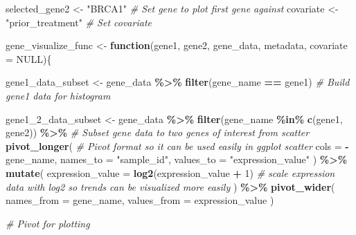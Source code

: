 \documentclass[
]{article}
\newenvironment{Shaded}{\begin{snugshade}}{\end{snugshade}}
\newcommand{\AttributeTok}[1]{\textcolor[rgb]{0.13,0.29,0.53}{#1}}
\newcommand{\CommentTok}[1]{\textcolor[rgb]{0.56,0.35,0.01}{\textit{#1}}}
\newcommand{\ConstantTok}[1]{\textcolor[rgb]{0.56,0.35,0.01}{#1}}
\newcommand{\ControlFlowTok}[1]{\textcolor[rgb]{0.13,0.29,0.53}{\textbf{#1}}}
\newcommand{\DecValTok}[1]{\textcolor[rgb]{0.00,0.00,0.81}{#1}}
\newcommand{\FunctionTok}[1]{\textcolor[rgb]{0.13,0.29,0.53}{\textbf{#1}}}
\newcommand{\NormalTok}[1]{#1}
\newcommand{\OtherTok}[1]{\textcolor[rgb]{0.56,0.35,0.01}{#1}}
\newcommand{\SpecialCharTok}[1]{\textcolor[rgb]{0.81,0.36,0.00}{\textbf{#1}}}
\newcommand{\StringTok}[1]{\textcolor[rgb]{0.31,0.60,0.02}{#1}}
\begin{document}
\begin{Shaded}
\begin{Highlighting}[]
\NormalTok{selected\_gene2 }\OtherTok{\textless{}{-}} \StringTok{"BRCA1"} \CommentTok{\# Set gene to plot first gene against }
\NormalTok{covariate }\OtherTok{\textless{}{-}} \StringTok{"prior\_treatment"} \CommentTok{\# Set covariate}

\NormalTok{gene\_visualize\_func }\OtherTok{\textless{}{-}} \ControlFlowTok{function}\NormalTok{(gene1, gene2, gene\_data, metadata, }\AttributeTok{covariate =} \ConstantTok{NULL}\NormalTok{)\{}
  
\NormalTok{  gene1\_data\_subset }\OtherTok{\textless{}{-}}\NormalTok{ gene\_data }\SpecialCharTok{\%\textgreater{}\%} 
    \FunctionTok{filter}\NormalTok{(gene\_name }\SpecialCharTok{==}\NormalTok{ gene1) }\CommentTok{\# Build gene1 data for histogram}
  
\NormalTok{  gene1\_2\_data\_subset }\OtherTok{\textless{}{-}}\NormalTok{ gene\_data }\SpecialCharTok{\%\textgreater{}\%}
    \FunctionTok{filter}\NormalTok{(gene\_name }\SpecialCharTok{\%in\%} \FunctionTok{c}\NormalTok{(gene1, gene2)) }\SpecialCharTok{\%\textgreater{}\%} \CommentTok{\# Subset gene data to two genes of interest from scatter}
    \FunctionTok{pivot\_longer}\NormalTok{( }\CommentTok{\# Pivot format so it can be used easily in ggplot scatter}
      \AttributeTok{cols =} \SpecialCharTok{{-}}\NormalTok{gene\_name,}
      \AttributeTok{names\_to =} \StringTok{"sample\_id"}\NormalTok{,}
      \AttributeTok{values\_to =} \StringTok{"expression\_value"}
\NormalTok{    ) }\SpecialCharTok{\%\textgreater{}\%}
    \FunctionTok{mutate}\NormalTok{(}
      \AttributeTok{expression\_value =} \FunctionTok{log2}\NormalTok{(expression\_value }\SpecialCharTok{+} \DecValTok{1}\NormalTok{) }\CommentTok{\# scale expression data with log2 so trends can be visualized more easily}
\NormalTok{    ) }\SpecialCharTok{\%\textgreater{}\%}
    \FunctionTok{pivot\_wider}\NormalTok{(}
      \AttributeTok{names\_from =}\NormalTok{ gene\_name,}
      \AttributeTok{values\_from =}\NormalTok{ expression\_value}
\NormalTok{    )}
  
  \CommentTok{\# Pivot for plotting}
  

\end{Highlighting}
\end{Shaded}
\end{document}
